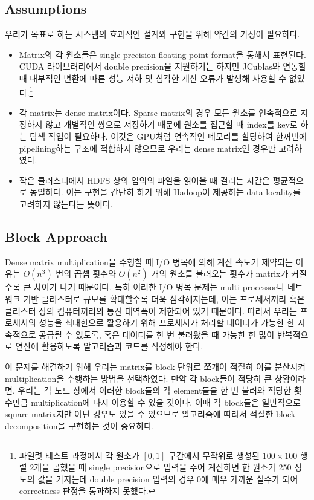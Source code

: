 \documentclass[a4paper]{article}
\begin{document}
\begin{multicols}{2}
\subsection{Assumptions}
우리가 목표로 하는 시스템의 효과적인 설계와 구현을 위해 약간의 가정이 필요하다.
\begin{itemize}
	\item Matrix의 각 원소들은 single precision floating point format을 통해서 표현된다. CUDA 라이브러리에서 double precision을 지원하기는 하지만 JCublas와 연동할 때 내부적인 변환에 따른 성능 저하 및 심각한 계산 오류가 발생해 사용할 수 없었다.\footnote{파일럿 테스트 과정에서 각 원소가 $[0,1]$ 구간에서 무작위로 생성된 $100 \times 100$ 행렬 2개을 곱했을 때 single precision으로 입력을 주어 계산하면 한 원소가 250 정도의 값을 가지는데 double precision 입력의 경우 0에 매우 가까운 실수가 되어 correctness 판정을 통과하지 못했다.}
	\item 각 matrix는 dense matrix이다. Sparse matrix의 경우 모든 원소를 연속적으로 저장하지 않고 개별적인 쌍으로 저장하기 때문에 원소를 접근할 때 index를 key로 하는 탐색 작업이 필요하다. 이것은 GPU처럼 연속적인 메모리를 할당하여 한꺼번에 pipelining하는 구조에 적합하지 않으므로 우리는 dense matrix인 경우만 고려하였다.
	\item 작은 클러스터에서 HDFS 상의 임의의 파일을 읽어올 때 걸리는 시간은 평균적으로 동일하다. 이는 구현을 간단히 하기 위해 Hadoop이 제공하는 data locality를 고려하지 않는다는 뜻이다.
\end{itemize}

\subsection{Block Approach}
Dense matrix multiplication을 수행할 때 I/O 병목에 의해 계산 속도가 제약되는 이유는 $O(n^3)$ 번의 곱셈 횟수와 $O(n^2)$ 개의 원소를 불러오는 횟수가 matrix가 커질수록 큰 차이가 나기 때문이다.
특히 이러한 I/O 병목 문제는 multi-processor나 네트워크 기반 클러스터로 규모를 확대할수록 더욱 심각해지는데, 이는 프로세서끼리 혹은 클러스터 상의 컴퓨터끼리의 통신 대역폭이 제한되어 있기 때문이다.
따라서 우리는 프로세서의 성능을 최대한으로 활용하기 위해 프로세서가 처리할 데이터가 가능한 한 지속적으로 공급될 수 있도록, 혹은 데이터를 한 번 불러왔을 때 가능한 한 많이 반복적으로 연산에 활용하도록 알고리즘과 코드를 작성해야 한다.

이 문제를 해결하기 위해 우리는 matrix를 block 단위로 쪼개어 적절히 이를 분산시켜 multiplication을 수행하는 방법을 선택하였다.
만약 각 block들이 적당히 큰 상황이라면, 우리는 각 노드 상에서 이러한 block들의 각 element들을 한 번 불러와 적당한 횟수만큼 multiplication에 다시 이용할 수 있을 것이다.
이때 각 block들은 일반적으로 square matrix지만 아닌 경우도 있을 수 있으므로 알고리즘에 따라서 적절한 block decomposition을 구현하는 것이 중요하다.


\end{multicols}
\end{document}
